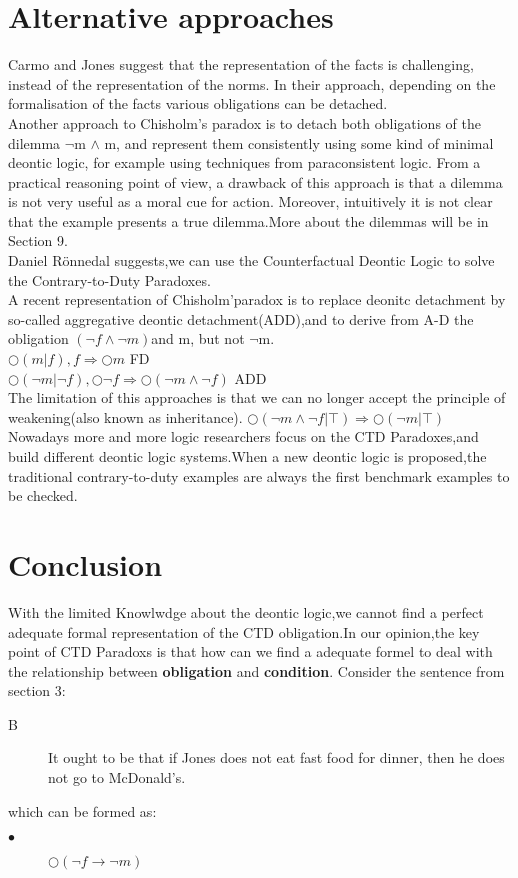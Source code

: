 \documentclass{article}
\begin{document}
\section{Alternative approaches}
Carmo and Jones \cite{5} suggest that the representation of the facts is challenging,
instead of the representation of the norms. In their approach, depending on the
formalisation of the facts various obligations can be detached.\\
Another approach to Chisholm’s paradox is to detach both obligations of the
dilemma  $\neg$m $\wedge$ m, and represent them consistently using some kind of minimal
deontic logic, for example using techniques from paraconsistent logic. From a practical reasoning point of view, a drawback of this approach is that a dilemma is not
very useful as a moral cue for action. Moreover, intuitively it is not clear that the
example presents a true dilemma.More about the dilemmas will be in Section 9.\\

Daniel Rönnedal\cite{6} suggests,we can use the Counterfactual Deontic Logic to solve the Contrary-to-Duty Paradoxes.\\
A recent representation of Chisholm'paradox is to replace deonitc detachment by so-called aggregative deontic detachment(ADD),and to derive from A-D the obligation  $(\neg f \wedge \neg m)$and m, but not $\neg $m.\\
$\bigcirc (m|f),f \Rightarrow \bigcirc m $ FD\\
$\bigcirc(\neg m |\neg f),\bigcirc\neg f \Rightarrow \bigcirc(\neg m \wedge \neg f)$ ADD\\
The limitation of this approaches is that we can no longer accept the principle of weakening(also known as inheritance). 
$\bigcirc(\neg m \wedge\neg f|\top) \Rightarrow \bigcirc(\neg m |\top)$\\
Nowadays more and more logic researchers focus on the CTD Paradoxes,and build different deontic logic systems.When a new deontic logic is proposed,the traditional contrary-to-duty examples are always the first benchmark examples to be checked.
\section{Conclusion}
With the limited Knowlwdge about the deontic logic,we cannot find a perfect adequate formal representation of the CTD obligation.In our opinion,the key point of CTD Paradoxs is that how can we find a adequate formel to deal with the relationship between \textbf{obligation} and \textbf{condition}.
Consider the sentence from section 3:
\begin{description}
\item[B] It ought to be that if Jones does not eat fast food for dinner, then he does not go to McDonald’s.
\end{description}
which can be formed as:
\begin{description}
\item[$\bullet $]$\bigcirc (\neg f \rightarrow\neg m)$
\end{description}
\end{document}
